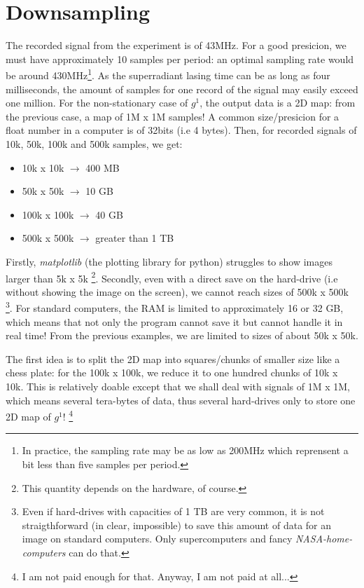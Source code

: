 \documentclass[11pt]{report}
\begin{document}
\section{Downsampling}

The recorded signal from the experiment is of 43MHz. For a good presicion, we must have approximately 10 samples per period: an optimal sampling rate would be around 430MHz\footnote{In practice, the sampling rate may be as low as 200MHz which reprensent a bit less than five samples per period.}. As the superradiant lasing time can be as long as four milliseconds, the amount of samples for one record of the signal may easily exceed one million. For the non-stationary case of $g^1$, the output data is a 2D map: from the previous case, a map of 1M x 1M samples! A common size/presicion for a float number in a computer is of 32bits (i.e 4 bytes). Then, for recorded signals of 10k, 50k, 100k and 500k samples, we get:
\begin{itemize}
	\item 10k x 10k $\rightarrow$ 400 MB
	\item 50k x 50k $\rightarrow$ 10 GB
	\item 100k x 100k $\rightarrow$ 40 GB
	\item 500k x 500k $\rightarrow$ greater than 1 TB
\end{itemize}
Firstly, \textit{matplotlib} (the plotting library for python) struggles to show images larger than 5k x 5k \footnote{This quantity depends on the hardware, of course.}. Secondly, even with a direct save on the hard-drive (i.e without showing the image on the screen), we cannot reach sizes of 500k x 500k \footnote{Even if hard-drives with capacities of 1 TB are very common, it is not straigthforward (in clear, impossible) to save this amount of data for an image on standard computers. Only supercomputers and fancy \textit{NASA-home-computers} can do that.}. For standard computers, the RAM is limited to approximately 16 or 32 GB, which means that not only the program cannot save it but cannot handle it in real time! From the previous examples, we are limited to sizes of about 50k x 50k.

The first idea is to split the 2D map into squares/chunks of smaller size like a chess plate: for the 100k x 100k, we reduce it to one hundred chunks of 10k x 10k. This is relatively doable except that we shall deal with signals of 1M x 1M, which means several tera-bytes of data, thus several hard-drives only to store one 2D map of $g^1$! \footnote{I am not paid enough for that. Anyway, I am not paid at all...}
\end{document}

